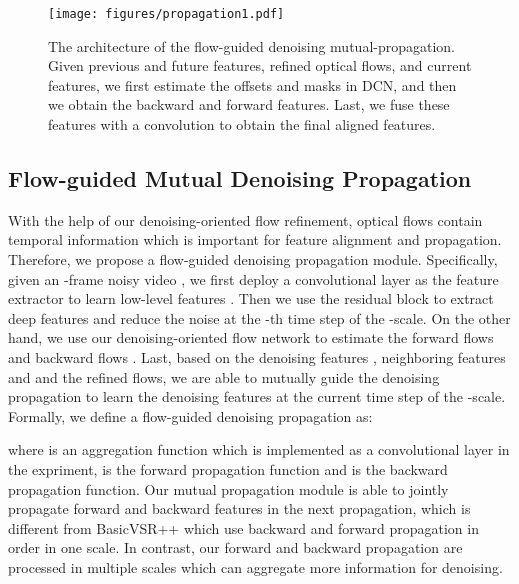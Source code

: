 \documentclass[10pt,twocolumn,letterpaper]{article}
\newlength \g
\begin{document}
\begin{figure*}[t]
  \begin{center}
  \vspace{-1mm}
  \texttt{[image: figures/propagation1.pdf]}
  \end{center}
  \vspace{-3mm}
  \caption{The architecture of the flow-guided denoising mutual-propagation. Given previous and future features, refined optical flows, and current features, we first estimate the offsets and masks in DCN, and then we obtain the backward and forward features. Last, we fuse these features with a convolution to obtain the final aligned features.}
  \label{fig:propagation}
  \vspace{-4mm}
\end{figure*} 

\newpage
\subsection{Flow-guided Mutual Denoising Propagation} 
With the help of our denoising-oriented flow refinement, optical flows contain temporal information which is important for feature alignment and propagation.
Therefore, we propose a flow-guided denoising propagation module.
Specifically, given an -frame noisy video , we first deploy a convolutional layer as the feature extractor to learn low-level features .
Then we use the residual block to extract deep features  and reduce the noise at the -th time step of the -scale.
On the other hand, we use our denoising-oriented flow network to estimate the forward flows  and backward flows .
Last, based on the denoising features , neighboring features  and  and the refined flows, we are able to mutually guide the denoising propagation to learn the denoising features  at the current time step of the -scale.
Formally, we define a flow-guided denoising propagation as:

where  is an aggregation function which is implemented as a  convolutional layer in the expriment,  is the forward propagation function  and  is the backward propagation function.
Our mutual propagation module is able to jointly propagate forward and backward features in the next propagation, which is different from BasicVSR++ \cite{chan2021basicvsrpp} which use backward and forward propagation in order in one scale.
In contrast, our forward and backward propagation are processed in multiple scales which can aggregate more information for denoising.
\end{document}
